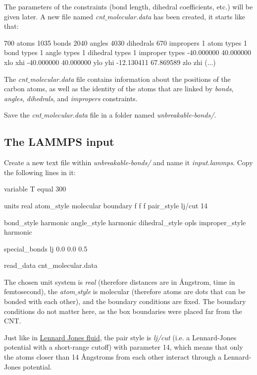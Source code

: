 \noindent The parameters of the constraints (bond length,
dihedral coefficients, etc.) will be given later.
A new file named \textit{cnt$\_$molecular.data} has been created, it starts
like that:

\begin{lcverbatim}
700 atoms
1035 bonds
2040 angles
4030 dihedrals
670 impropers
1 atom types
1 bond types
1 angle types
1 dihedral types
1 improper types
-40.000000 40.000000  xlo xhi
-40.000000 40.000000  ylo yhi
-12.130411 67.869589  zlo zhi
(...)
\end{lcverbatim}

\noindent The \textit{cnt$\_$molecular.data} file contains information
about the positions of the carbon atoms, as well as the
identity of the atoms that are linked by \textit{bonds}, \textit{angles}, \textit{dihedrals},
and \textit{impropers} constraints.

\vspace{0.25cm} \noindent Save the \textit{cnt$\_$molecular.data} file in a folder named \textit{unbreakable-bonds/}.

\subsection{The LAMMPS input}
\noindent Create a new text file within \textit{unbreakable-bonds/} and name
it \textit{input.lammps}. Copy the following lines in it:

\begin{lcverbatim}
variable T equal 300

units real
atom_style molecular
boundary f f f
pair_style lj/cut 14

bond_style harmonic
angle_style harmonic
dihedral_style opls
improper_style harmonic

special_bonds lj 0.0 0.0 0.5

read_data cnt_molecular.data
\end{lcverbatim}

\noindent The chosen unit system is \textit{real} (therefore distances are in Ångstrom, time in femtosecond),
the \textit{atom$\_$style} is molecular (therefore atoms are dots that can be bonded with each other),
and the boundary conditions are fixed. The boundary conditions
do not matter here, as the box boundaries were placed far from the CNT. 

\vspace{0.25cm} \noindent Just like in \hyperref[lennard-jones-label]{Lennard Jones fluid},
the pair style is \textit{lj/cut} (i.e. a Lennard-Jones potential 
with a short-range cutoff) with
parameter 14, which means that only the atoms closer than 14
Ångstroms from each other interact through a Lennard-Jones
potential.

